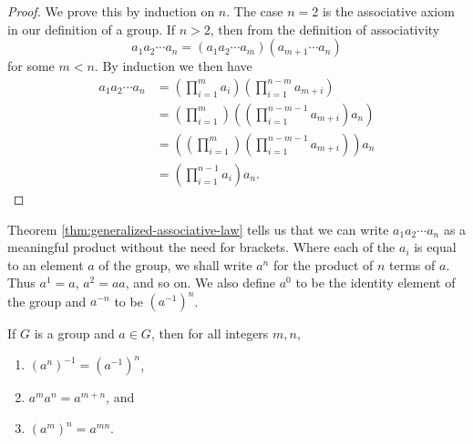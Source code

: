 \begin{proof}
    We prove this by induction on \(n\). The case \(n = 2\) is the associative
    axiom in our definition of a group. If \(n > 2\), then from the definition
    of associativity
    \[
        a_1 a_2 \cdots a_n = (a_1 a_2 \cdots a_m)(a_{m + 1} \cdots a_n)
    \]
    for some \(m < n\). By induction we then have
    \begin{align*}
        a_1 a_2 \cdots a_n & = \left(\prod_{i = 1}^m a_i\right)\left(\prod_{i = 1}^{n - m} a_{m + i}\right)\\
        & = \left(\prod_{i =1}^{m}\right)\left(\left(\prod_{i = 1}^{n - m - 1} a_{m + i}\right)a_n\right)\\
        & = \left(\left(\prod_{i = 1}^{m}\right)\left(\prod_{i = 1}^{n - m- 1} a_{m + i}\right)\right)a_n\\
        & = \left(\prod_{i = 1}^{n - 1} a_i\right)a_n.
    \end{align*}
\end{proof}

\begin{remark}
    Theorem \ref{thm:generalized-associative-law} tells us that we can write
    \(a_1 a_2 \cdots a_n\) as a meaningful product without the need for
    brackets. Where each of the \(a_i\) is equal to an element \(a\) of the
    group, we shall write \(a^n\) for the product of \(n\) terms of \(a\). Thus
    \(a^1 = a\), \(a^2 = aa\), and so on. We also define \(a^0\) to be the
    identity element of the group and \(a^{-n}\) to be \((a^{-1})^n\).
\end{remark}

\begin{theorem}
    If \(G\) is a group and \(a \in G\), then for all integers \(m, n\),
    \begin{enumerate}[label=(\alph*)]
        \item \((a^n)^{-1} = (a^{-1})^n\),
        \item \(a^m a^n = a^{m + n}\), and
        \item \((a^m)^n = a^{mn}\).
    \end{enumerate}
\end{theorem}

